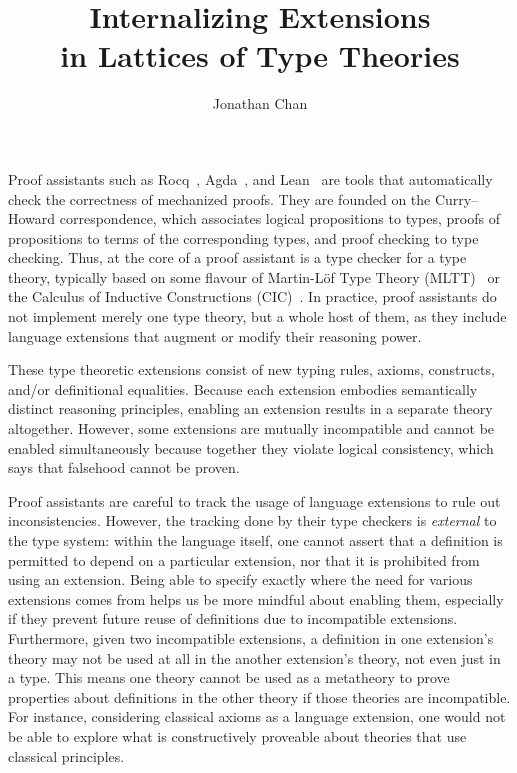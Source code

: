 \documentclass{article}
\title{\textbf{Internalizing Extensions \\ in Lattices of Type Theories}}
\author{Jonathan Chan}
\date{\vspace{-\baselineskip}}
\begin{document}
\maketitle

Proof assistants such as Rocq~\citep{coq}, Agda~\citep{agda}, and Lean~\citep{lean}
are tools that automatically check the correctness of mechanized proofs.
They are founded on the Curry--Howard correspondence,
which associates logical propositions to types,
proofs of propositions to terms of the corresponding types,
and proof checking to type checking.
Thus, at the core of a proof assistant is a type checker for a type theory,
typically based on some flavour of Martin-L\"of Type Theory (MLTT)~\citep{mltt}
or the Calculus of Inductive Constructions (CIC)~\citep{cic}.
In practice, proof assistants do not implement merely one type theory,
but a whole host of them, as they include language extensions
that augment or modify their reasoning power.

These type theoretic extensions consist of new typing rules,
axioms, constructs, and/or definitional equalities.
Because each extension embodies semantically distinct reasoning principles,
enabling an extension results in a separate theory altogether.
However, some extensions are mutually incompatible and cannot be enabled simultaneously
because together they violate logical consistency,
which says that falsehood cannot be proven.

Proof assistants are careful to track
the usage of language extensions to rule out inconsistencies.
However, the tracking done by their type checkers is \emph{external} to the type system:
within the language itself,
one cannot assert that a definition is permitted to depend on a particular extension,
nor that it is prohibited from using an extension.
Being able to specify exactly where the need for various extensions comes from
helps us be more mindful about enabling them,
especially if they prevent future reuse of definitions due to incompatible extensions.
Furthermore, given two incompatible extensions,
a definition in one extension's theory may not be used at all
in the another extension's theory, not even just in a type.
This means one theory cannot be used as a metatheory
to prove properties about definitions in the other theory
if those theories are incompatible.
For instance, considering classical axioms as a language extension,
one would not be able to explore what is constructively proveable
about theories that use classical principles.
\end{document}
